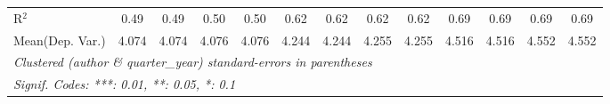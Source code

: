 \begin{tabular}{lcccccccccccc}
   R$^2$                                    & 0.49    & 0.49          & 0.50    & 0.50          & 0.62       & 0.62          & 0.62        & 0.62           & 0.69    & 0.69    & 0.69    & 0.69\\  
Mean(Dep. Var.) & 4.074 & 4.074 & 4.076 & 4.076 & 4.244 & 4.244 & 4.255 & 4.255 & 4.516 & 4.516 & 4.552 & 4.552 \\
   \midrule \midrule
   \multicolumn{13}{l}{\emph{Clustered (author \& quarter\_year) standard-errors in parentheses}}\\
   \multicolumn{13}{l}{\emph{Signif. Codes: ***: 0.01, **: 0.05, *: 0.1}}\\
\end{tabular}
\par\endgroup
